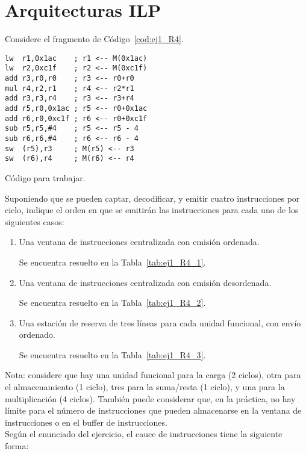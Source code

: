 \section{Arquitecturas ILP}

\begin{ejercicio} \label{ej:1_R4}
    Considere el fragmento de Código~\ref{cod:ej1_R4}.
    \begin{listing}[H]
    \begin{verbatim}
lw  r1,0x1ac    ; r1 <-- M(0x1ac)
lw  r2,0xc1f    ; r2 <-- M(0xc1f)
add r3,r0,r0    ; r3 <-- r0+r0
mul r4,r2,r1    ; r4 <-- r2*r1
add r3,r3,r4    ; r3 <-- r3+r4
add r5,r0,0x1ac ; r5 <-- r0+0x1ac
add r6,r0,0xc1f ; r6 <-- r0+0xc1f
sub r5,r5,#4    ; r5 <-- r5 - 4
sub r6,r6,#4    ; r6 <-- r6 - 4
sw  (r5),r3     ; M(r5) <-- r3
sw  (r6),r4     ; M(r6) <-- r4
    \end{verbatim}
    \caption{Código para trabajar.}
    \label{cod:ej1_R4}
\end{listing}
Suponiendo que se pueden captar, decodificar, y emitir cuatro instrucciones por ciclo, indique el orden en que se emitirán las instrucciones para cada uno de los siguientes casos:
\begin{enumerate}
    \item Una ventana de instrucciones centralizada con emisión ordenada.
    
    Se encuentra resuelto en la Tabla~\ref{tab:ej1_R4_1}.
    \item Una ventana de instrucciones centralizada con emisión desordenada.
    
    Se encuentra resuelto en la Tabla~\ref{tab:ej1_R4_2}.
    \item Una estación de reserva de tres líneas para cada unidad funcional, con envío ordenado.

    Se encuentra resuelto en la Tabla~\ref{tab:ej1_R4_3}.
\end{enumerate}

Nota: considere que hay una unidad funcional para la carga (2 ciclos), otra para el almacenamiento (1 ciclo), tres para la suma/resta (1 ciclo), y una para la multiplicación (4 ciclos). También puede considerar que, en la práctica, no hay límite para el número de instrucciones que pueden almacenarse en la ventana de instrucciones o en el buffer de instrucciones.\\

Según el enunciado del ejercicio, el cauce de instrucciones tiene la siguiente forma:
\begin{figure}[H]
\centering
{}
\end{figure}
\end{ejercicio}
